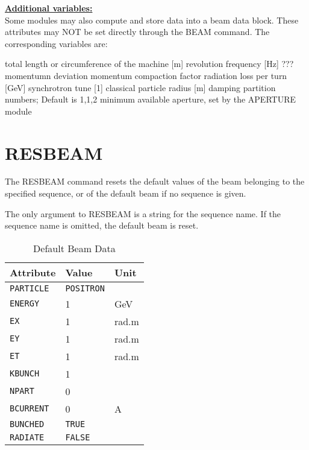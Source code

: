 {\bf \underline{Additional variables:}}\\ 
Some \mad modules may also compute and store data into a beam data 
block. These attributes may NOT be set directly through the BEAM
command. The corresponding variables are:  
\begin{madlist}
   total length or circumference of the machine [m]
   revolution frequency [Hz]
   ???
   momentumn deviation
   momentum compaction factor
   radiation loss per turn [GeV]
   synchrotron tune [1]
   classical particle radius [m]
   damping partition numbers; Default is {1,1,2}
   minimum available aperture, set by the APERTURE module
\end{madlist}

\section{RESBEAM}
\label{sec:resbeam}

The RESBEAM command resets the default values of the beam belonging to
the specified sequence, or of the default beam if no sequence is given.  


The only argument to RESBEAM is a string for the sequence name.
If the sequence name is omitted, the default beam is reset. 

\begin{table}[h]
  \caption{Default Beam Data}
  \vspace{1ex}
  \begin{center}
     \begin{tabular}{|l|l|l|}
       \hline
       {\bf Attribute}   &  {\bf Value} & {\bf Unit}  \\
       \hline
       \texttt{PARTICLE} &  \texttt{POSITRON} & \\
       \texttt{ENERGY}   &  1           & GeV \\
       \texttt{EX}       &  1           & rad.m \\
       \texttt{EY}       &  1           & rad.m \\
       \texttt{ET}       &  1           & rad.m \\
       \texttt{KBUNCH}   &  1           & \\
       \texttt{NPART}    &  0           & \\
       \texttt{BCURRENT} &  0           & A \\
       \texttt{BUNCHED}  &  \texttt{TRUE}  & \\
       \texttt{RADIATE}  &  \texttt{FALSE} & \\     
       \hline
     \end{tabular}
  \end{center}
\end{table}


